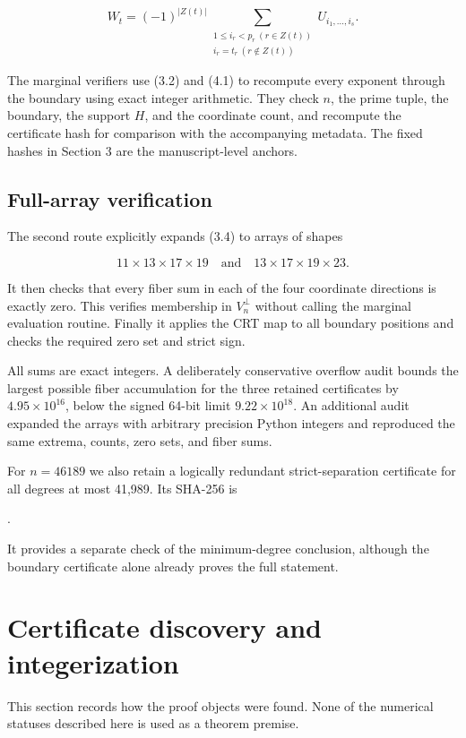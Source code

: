 \documentclass[11pt]{article}
\numberwithin{equation}{section}
\begin{document}
\nopagebreak[4]
\[
W_t=(-1)^{|Z(t)|}
\sum_{\substack{1\leq i_r<p_r\ (r\in Z(t))\\
i_r=t_r\ (r\notin Z(t))}}
U_{i_1,\ldots,i_s}.
\tag{4.1}
\]

The marginal verifiers use (3.2) and (4.1) to recompute every exponent through
the boundary using exact integer arithmetic. They check $n$, the prime tuple,
the boundary, the support $H$, and the coordinate count, and recompute the
certificate hash for comparison with the accompanying metadata. The fixed
hashes in Section 3 are the manuscript-level anchors.

\subsection{Full-array verification}


The second route explicitly expands (3.4) to arrays of shapes

\nopagebreak[4]
\[
11\times13\times17\times19
\quad\text{and}\quad
13\times17\times19\times23.
\]

It then checks that every fiber sum in each of the four coordinate directions
is exactly zero. This verifies membership in $V_n^\perp$ without calling the
marginal evaluation routine. Finally it applies the CRT map to all boundary
positions and checks the required zero set and strict sign.

All sums are exact integers. A deliberately conservative overflow audit bounds
the largest possible fiber accumulation for the three retained certificates
by $4.95\times10^{16}$, below the signed 64-bit limit
$9.22\times10^{18}$. An additional audit expanded the arrays with arbitrary
precision Python integers and reproduced the same extrema, counts, zero sets,
and fiber sums.

For $n=46189$ we also retain a logically redundant strict-separation
certificate for all degrees at most 41,989. Its SHA-256 is

{\small{}}.

It provides a separate check of the minimum-degree conclusion, although the
boundary certificate alone already proves the full statement.

\section{Certificate discovery and integerization}


This section records how the proof objects were found. None of the numerical
statuses described here is used as a theorem premise.
\end{document}
